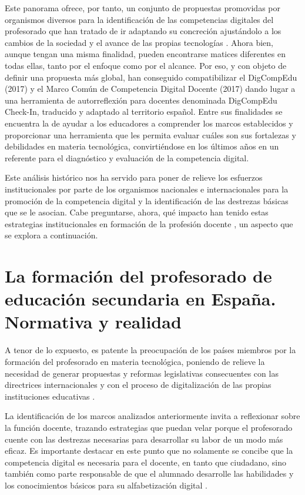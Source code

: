 \documentclass[spanish]{textolivre}
\begin{document}
Este panorama ofrece, por tanto, un conjunto de propuestas promovidas por organismos diversos para la identificación de las competencias digitales del profesorado que han tratado de ir adaptando su concreción ajustándolo a los cambios de la sociedad y el avance de las propias tecnologías \cite{gabarda_mendez_competencias_2022}. Ahora bien, aunque tengan una misma finalidad, pueden encontrarse matices diferentes en todas ellas, tanto por el enfoque como por el alcance. Por eso, y con objeto de definir una propuesta más global, \textcite{cabero-almenara_marco_2020} han conseguido compatibilizar el DigCompEdu (2017) y el Marco Común de Competencia Digital Docente (2017) dando lugar a una herramienta de autorreflexión para docentes denominada DigCompEdu Check-In, traducido y adaptado al territorio español. Entre sus finalidades se encuentra la de ayudar a los educadores a comprender los marcos establecidos y proporcionar una herramienta que les permita evaluar cuáles son sus fortalezas y debilidades en materia tecnológica, convirtiéndose en los últimos años en un referente para el diagnóstico y evaluación de la competencia digital.

Este análisis histórico nos ha servido para poner de relieve los esfuerzos institucionales por parte de los organismos nacionales e internacionales para la promoción de la competencia digital y la identificación de las destrezas básicas que se le asocian. Cabe preguntarse, ahora, qué impacto han tenido estas estrategias institucionales en formación de la profesión docente \cite{cuartero_duran_certificacion_2019}, un aspecto que se explora a continuación.

\section{La formación del profesorado de educación secundaria en España. Normativa y realidad}
A tenor de lo expuesto, es patente la preocupación de los países miembros por la formación del profesorado en materia tecnológica, poniendo de relieve la necesidad de generar propuestas y reformas legislativas consecuentes con las directrices internacionales \cite{gabarda_mendez_profesorado_2021} y con el proceso de digitalización de las propias instituciones educativas \cite{tondeur2016}.

La identificación de los marcos analizados anteriormente invita a reflexionar sobre la función docente, trazando estrategias que puedan velar porque el profesorado cuente con las destrezas necesarias para desarrollar su labor de un modo más eficaz. Es importante destacar en este punto que no solamente se concibe que la competencia digital es necesaria para el docente, en tanto que ciudadano, sino también como parte responsable de que el alumnado desarrolle las habilidades y los conocimientos básicos para su alfabetización digital \cite{prendes_competencia_2018}.
\end{document}
